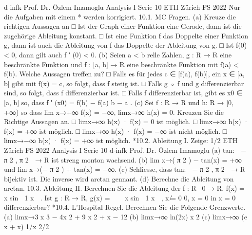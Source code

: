 d-infk
Prof. Dr. Özlem Imamoglu
Analysis I
Serie 10
ETH Zürich
FS 2022
Nur die Aufgaben mit einem * werden korrigiert.
10.1. MC Fragen.
(a) Kreuze die richtigen Aussagen an
□ Ist der Graph einer Funktion eine Gerade, dann ist die zugehörige Ableitung
konstant.
□ Ist eine Funktion f das Doppelte einer Funktion g, dann ist auch die
Ableitung von f das Doppelte der Ableitung von g.
□ Ist f(0) < 0, dann gilt auch f
′
(0) < 0.
(b) Seien a < b relle Zahlen, g : R → R eine beschränkte Funktion und
f : [a, b] → R eine beschränkte Funktion mit f(a) < f(b). Welche Aussagen
treffen zu?
□ Falls es für jedes c ∈ [f(a), f(b)], ein x ∈ [a, b] gibt mit f(x) = c, so folgt,
dass f stetig ist.
□ Falls g ◦ f und g differenzierbar sind, so folgt, dass f differenzierbar ist.
□ Falls f differenzierbar ist, gibt es x0 ∈ [a, b] so, dass
f
′
(x0) = f(b) − f(a)
b − a
.
(c) Sei f : R → R und h: R → [0, +∞) so dass
lim x→+∞
f(x) = −∞, limx→∞
h(x) = 0.
Kreuzen Sie die Richtige Aussagen an.
□ limx→∞ h(x) · f(x) = 0 ist möglich.
□ limx→∞ h(x) · f(x) = +∞ ist möglich.
□ limx→∞ h(x) · f(x) = −∞ ist nicht möglich.
□ limx→−∞ h(x) · f(x) = +∞ ist möglich.
*10.2. Ableitung I.
Zeige:
1/2
ETH Zürich
FS 2022
Analysis I
Serie 10
d-infk
Prof. Dr. Özlem Imamoglu
(a)
tan: 
−
π
2
,
π
2

→ R
ist streng monton wachsend.
(b)
lim
x→(
π
2 )
−
tan(x) = +∞ und lim
x→(− π
2 )
+
tan(x) = −∞.
(c) Schliesse, dass tan: 
−
π
2
,
π
2

→ R bijektiv ist. Die inverse wird arctan gennant.
(d) Berechne die Ableitung von arctan.
10.3. Ableitung II. Berechnen Sie die Ableitung der f : R \ {0} → R, f(x) =
x sin 
1
x

.
Ist
g : R → R, g(x) =



x sin 
1
x

, x ̸= 0
0, x = 0
in x = 0 differenzierbar?
*10.4. L’Hospital Regel. Berechnen Sie die Folgende Grenzwerte.
(a) limx→3
x
3 − 4x
2 + 9
x
2 + x − 12
(b) limx→∞
ln(2x)
x
2
(c) limx→∞
(e
x + x)
1/x
2/2
